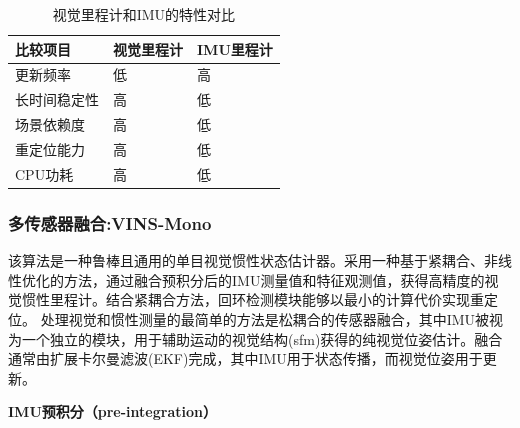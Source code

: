 \documentclass[cs4size,a4paper]{ctexart}
\numberwithin{equation}{section}
\numberwithin{table}{section}
\numberwithin{figure}{section}
\begin{document}
\begin{table}[H]
        \centering
        \begin{tabular}{l|ll}
        \toprule
        比较项目   &视觉里程计 & IMU里程计\\
        \midrule[2pt]
        更新频率 & 低    & 高\\
        长时间稳定性 & 高   & 低\\
        场景依赖度 & 高  &  低\\
        重定位能力 &  高  & 低\\
        CPU功耗 &  高 & 低\\
        \bottomrule
        \end{tabular}
        \caption{视觉里程计和IMU的特性对比}
\end{table}

\subsubsection{多传感器融合:VINS-Mono}
该算法\cite{8421746}是一种鲁棒且通用的单目视觉惯性状态估计器。采用一种基于紧耦合、非线性优化的方法，通过融合预积分后的IMU测量值和特征观测值，获得高精度的视觉惯性里程计。结合紧耦合方法，回环检测模块能够以最小的计算代价实现重定位。
处理视觉和惯性测量的最简单的方法是松耦合的传感器融合\cite{8576618,8630025}，其中IMU被视为一个独立的模块，用于辅助运动的视觉结构(sfm)获得的纯视觉位姿估计。融合通常由扩展卡尔曼滤波(EKF)完成，其中IMU用于状态传播，而视觉位姿用于更新。
  
\textbf{IMU预积分（pre-integration）}
\end{document}
